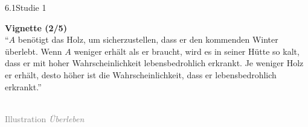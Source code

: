 \documentclass[xcolor=table,9pt,aspectratio=169]{beamer}
\begin{document}
\begin{frame}{\vspace*{10mm}6.1\hspace*{1em}Studie 1}
\begin{multicols}{2}
   \textbf{Vignette (2/5)}\\
   \medskip
   \enquote{$A$ benötigt das Holz, um sicherzustellen, dass er den kommenden Winter überlebt. Wenn $A$ weniger erhält als er braucht, wird es in seiner Hütte so kalt, dass er mit hoher Wahrscheinlichkeit lebensbedrohlich erkrankt. Je weniger Holz er erhält, desto höher ist die Wahrscheinlichkeit, dass er lebensbedrohlich erkrankt.}
   \vfill
   \begin{center}
      \\
      \textcolor{gray}{Illustration \textit{Überleben}}
   \end{center}
\end{multicols}
\end{frame}
\end{document}
